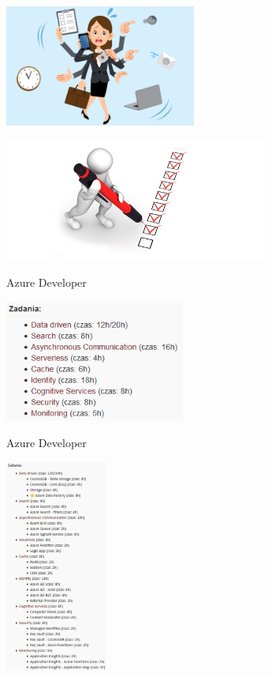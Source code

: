 \documentclass{beamer}
\begin{document}
\begin{frame}{}
	\begin{center}
		\includegraphics[height=4cm]{busy2.png}
	\end{center}
\end{frame}

\begin{frame}{}
	\begin{center}
		\includegraphics[height=4cm]{tasks1.jpg}
	\end{center}
\end{frame}

\begin{frame}{Azure Developer}
	\begin{center}
		\includegraphics[height=4cm]{azure_developer.png}
	\end{center}
\end{frame}

\begin{frame}{Azure Developer}
	\begin{center}
		\includegraphics[height=7cm]{azure_developer2.png}
	\end{center}
\end{frame}
\end{document}
